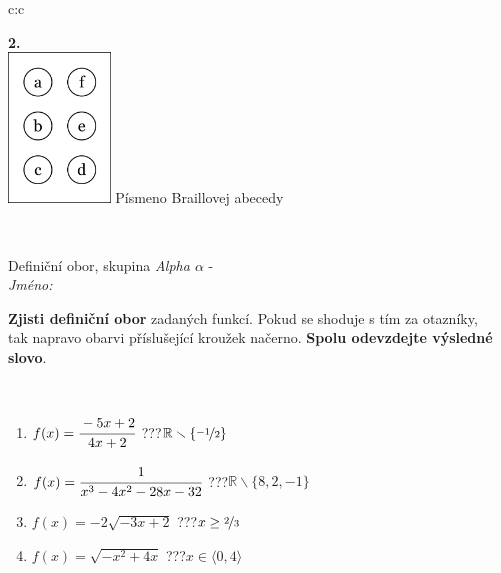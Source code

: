 \documentclass[10pt]{report}
\begin{document}
\begin{tabular}{c:c}
\begin{minipage}[c][104.5mm][t]{0.5\linewidth}
\begin{center}
\begin{minipage}{0.20\linewidth}
\begin{center}
{\Huge\bfseries 2.} \\[2mm]
\includegraphics[height=40mm]{../images/braille.png}
{\small Písmeno Braillovej abecedy}
\end{center}
\end{minipage}
\end{center}
\end{minipage}
\\ \hdashline
\begin{minipage}[c][104.5mm][t]{0.5\linewidth}
\begin{center}
\vspace{7mm}
{\huge Definiční obor, skupina \textit{Alpha $\alpha$} -}\\[5mm]
\textit{Jméno:}\phantom{xxxxxxxxxxxxxxxxxxxxxxxxxxxxxxxxxxxxxxxxxxxxxxxxxxxxxxxxxxxxxxxxx}\\[5mm]
\begin{minipage}{0.95\linewidth}
\begin{center}
\textbf{Zjisti definiční obor} zadaných funkcí. Pokud se shoduje s tím za otazníky,\\tak napravo obarvi příslušející kroužek načerno. \textbf{Spolu odevzdejte výsledné slovo}.
\end{center}
\end{minipage}
\\[1mm]
\begin{minipage}{0.79\linewidth}
\begin{center}
\begin{varwidth}{\linewidth}
\begin{enumerate}
\normalsizerrr
\item $f(x)=\cfrac{-5x+2}{4x+2}$\quad \dotfill\; ???\;\dotfill \quad $\mathbb{R}\smallsetminus\{\nicefrac{-1}{2}\}$
\item $f(x)=\cfrac{1}{x^3-4x^2-28x-32}$\quad \dotfill\; ???\;\dotfill \quad $\mathbb{R}\smallsetminus\{8,2,-1\}$
\item $f(x)=-2\sqrt{-3x+2}$\quad \dotfill\; ???\;\dotfill \quad $x\geq\nicefrac{2}{3}$
\item $f(x)=\sqrt{-x^2+4x}$\quad \dotfill\; ???\;\dotfill \quad $x\in\langle0 , 4\rangle$

\end{enumerate}
\end{varwidth}
\end{center}
\end{minipage}
\end{center}
\end{minipage}
\end{tabular}
\end{document}
